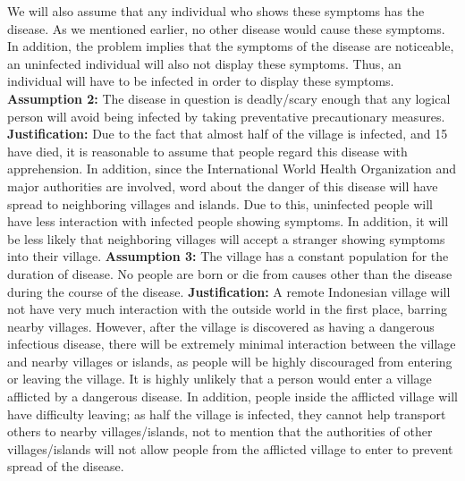 \documentclass[11pt]{article}
\begin{document}
We will also assume that any individual who shows these symptoms has the disease. As we mentioned earlier, no other disease would cause these symptoms. In addition, the problem implies that the symptoms of the disease are noticeable, an uninfected individual will also not display these symptoms. Thus, an individual will have to be infected in order to display these symptoms.
\newline
\newline
\textbf{Assumption 2:} The disease in question is deadly/scary enough that any logical person will avoid being infected by taking preventative precautionary measures.
\newline
\textbf{Justification:} Due to the fact that almost half of the village is infected, and 15 have died, it is reasonable to assume that people regard this disease with apprehension. In addition, since the International World Health Organization and major authorities are involved, word about the danger of this disease will have spread to neighboring villages and islands. Due to this, uninfected people will have less interaction with infected people showing symptoms. In addition, it will be less likely that neighboring villages will accept a stranger showing symptoms into their village.
\newline
\newline
\textbf{Assumption 3:} The village has a constant population for the duration of disease. No people are born or die from causes other than the disease during the course of the disease.
\newline
\textbf{Justification:} A remote Indonesian village will not have very much interaction with the outside world in the first place, barring nearby villages. However, after the village is discovered as having a dangerous infectious disease, there will be extremely minimal interaction between the village and nearby villages or islands, as people will be highly discouraged from entering or leaving the village. It is highly unlikely that a person would enter a village afflicted by a dangerous disease. In addition, people inside the afflicted village will have difficulty leaving; as half the village is infected, they cannot help transport others to nearby villages/islands, not to mention that the authorities of other villages/islands will not allow people from the afflicted village to enter to prevent spread of the disease.
\end{document}
